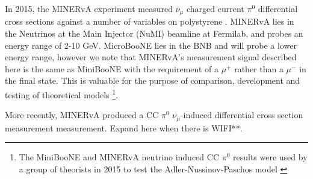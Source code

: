 \documentclass[12pt]{article}
\begin{document}
\par In 2015, the MINERvA experiment measured $\overline{\nu}_\mu$ charged current $\pi^0$ differential cross sections against a number of variables on polystyrene \cite{bib:minerva_thesis} \cite{bib:minerva_paper}.  MINERvA lies in the Neutrinos at the Main Injector (NuMI) beamline at Fermilab, and probes an energy range of 2-10 GeV.  MicroBooNE lies in the BNB and will probe a lower energy range, however we note that MINERvA's measurement signal described here is the same as MiniBooNE with the requirement of a $\mu^+$ rather than a $\mu^-$ in the final state. This is valuable for the purpose of comparison, development and testing of theoretical models \footnote{The MiniBooNE and MINERvA neutrino induced CC $\pi^0$ results were used by a group of theorists in 2015 to test the Adler-Nussinov-Paschos model \cite{bib:min_compare}}.

\par More recently, MINERvA produced a CC $\pi^0$ $\nu_{\mu}$-induced differential cross section measurement measurement. Expand here when there is WIFI**.  
\end{document}
